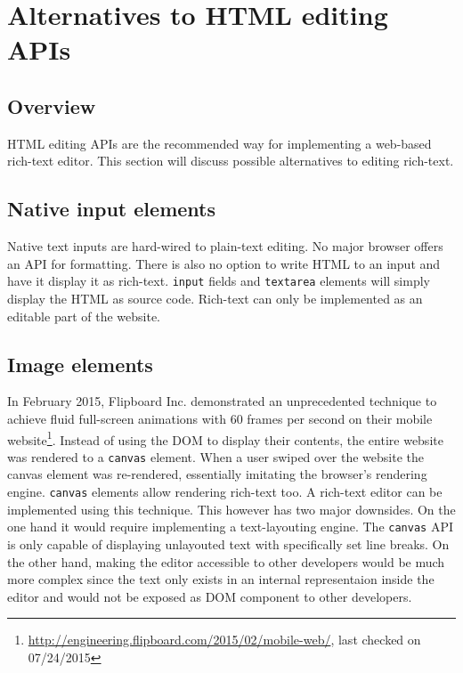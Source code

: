 \section{Alternatives to HTML editing APIs}

\subsection{Overview}

HTML editing APIs are the recommended way for implementing a web-based rich-text editor. This section will discuss possible alternatives to editing rich-text.

\subsection{Native input elements} Native text inputs are hard-wired to plain-text editing. No major browser offers an API for formatting. There is also no option to write HTML to an input and have it display it as rich-text. \texttt{input} fields and \texttt{textarea} elements will simply display the HTML as source code. Rich-text can only be implemented as an editable part of the website.

\subsection{Image elements} In February 2015, Flipboard Inc. demonstrated an unprecedented technique to achieve fluid full-screen animations with 60 frames per second on their mobile website\footnote{\url{http://engineering.flipboard.com/2015/02/mobile-web/}, last checked on 07/24/2015}. Instead of using the DOM to display their contents, the entire website was rendered to a \texttt{canvas} element. When a user swiped over the website the canvas element was re-rendered, essentially imitating the browser's rendering engine. \texttt{canvas} elements allow rendering rich-text too. A rich-text editor can be implemented using this technique. This however has two major downsides. On the one hand it would require implementing a text-layouting engine. The \texttt{canvas} API is only capable of displaying unlayouted text with specifically set line breaks. On the other hand, making the editor accessible to other developers would be much more complex since the text only exists in an internal representaion inside the editor and would not be exposed as DOM component to other developers.

